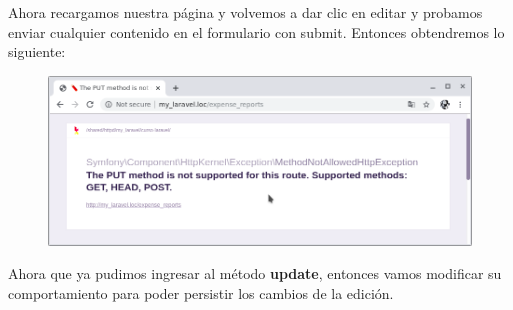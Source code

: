 \documentclass{article}
\begin{document}
Ahora recargamos nuestra página y volvemos a dar clic en editar y probamos
enviar cualquier contenido en el formulario con submit. Entonces obtendremos lo
siguiente:\\

\begin{figure}[h!]
  \centering
  \includegraphics[scale=0.5]{./Pictures/073_error_put.png}
\end{figure}

Ahora que ya pudimos ingresar al método \textbf{update}, entonces vamos
modificar su comportamiento para poder persistir los cambios de la edición.\\
\end{document}
